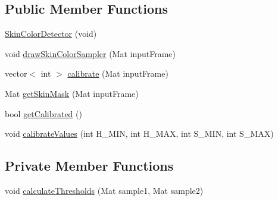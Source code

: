 \subsection*{Public Member Functions}
\begin{DoxyCompactItemize}
\item 
\hyperlink{class_gesture_detection_1_1_skin_color_detector_ab059f7f926aac46a712db749b4df4f27}{Skin\+Color\+Detector} (void)
\item 
void \hyperlink{class_gesture_detection_1_1_skin_color_detector_a4eb701f5b2761027b3e752d6b3de46c2}{draw\+Skin\+Color\+Sampler} (Mat input\+Frame)
\item 
vector$<$ int $>$ \hyperlink{class_gesture_detection_1_1_skin_color_detector_ae8b3880d1d75b07e356cd7d1ff128ed9}{calibrate} (Mat input\+Frame)
\item 
Mat \hyperlink{class_gesture_detection_1_1_skin_color_detector_a8cf2f51c4c7797a126b767e48458a006}{get\+Skin\+Mask} (Mat input\+Frame)
\item 
bool \hyperlink{class_gesture_detection_1_1_skin_color_detector_ad02c96fbc75934c86d22dd90ee726373}{get\+Calibrated} ()
\item 
void \hyperlink{class_gesture_detection_1_1_skin_color_detector_a4739dae25a983fb35a972f3c0ff8faaf}{calibrate\+Values} (int H\+\_\+\+M\+IN, int H\+\_\+\+M\+AX, int S\+\_\+\+M\+IN, int S\+\_\+\+M\+AX)
\end{DoxyCompactItemize}
\subsection*{Private Member Functions}
\begin{DoxyCompactItemize}
\item 
void \hyperlink{class_gesture_detection_1_1_skin_color_detector_abcb6b9a3ef251dbafb6bca73ae0929f8}{calculate\+Thresholds} (Mat sample1, Mat sample2)
\end{DoxyCompactItemize}
